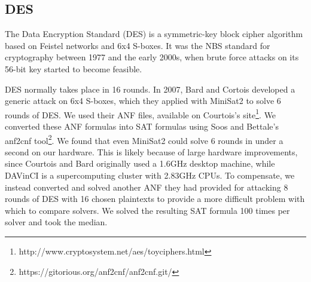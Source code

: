 \subsection{DES}
\label{sec:encoding:des}

The Data Encryption Standard (DES) is a symmetric-key block cipher algorithm based on Feistel networks and 6x4 S-boxes. It was the NBS standard for cryptography between 1977 and the early 2000s, when brute force attacks on its 56-bit key started to become feasible.\cite{Simmons16}

DES normally takes place in 16 rounds. In 2007, Bard and Cortois\cite{CB07} developed a generic attack on 6x4 S-boxes, which they applied with MiniSat2 to solve 6 rounds of DES.  We used their ANF files, available on Courtois's site\footnote{http://www.cryptosystem.net/aes/toyciphers.html}. We converted these ANF formulas into SAT formulas using Soos and Bettale's anf2cnf tool\footnote{https://gitorious.org/anf2cnf/anf2cnf.git/}. We found that even MiniSat2 could solve 6 rounds in under a second on our hardware. This is likely because of large hardware improvements, since Courtois and Bard originally used a 1.6GHz desktop machine, while DAVinCI is a supercomputing cluster with 2.83GHz CPUs. To compensate, we instead converted and solved another ANF they had provided for attacking 8 rounds of DES with 16 chosen plaintexts to provide a more difficult problem with which to compare solvers. We solved the resulting SAT formula 100 times per solver and took the median.